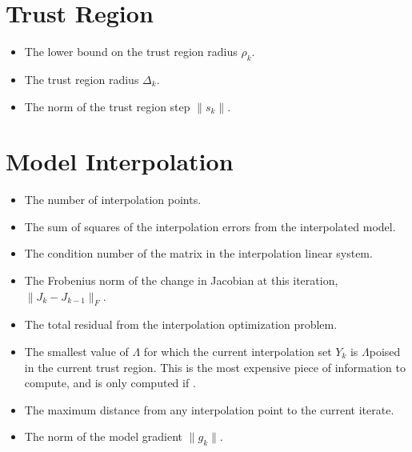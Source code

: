 \documentclass[letterpaper,10pt,english]{sphinxmanual}
\begin{document}
\section{Trust Region}
\label{\detokenize{diagnostic:trust-region}}\begin{itemize}
\item {} 
 \sphinxhyphen{} The lower bound on the trust region radius \(\rho_k\).

\item {} 
 \sphinxhyphen{} The trust region radius \(\Delta_k\).

\item {} 
 \sphinxhyphen{} The norm of the trust region step \(\|s_k\|\).

\end{itemize}


\section{Model Interpolation}
\label{\detokenize{diagnostic:model-interpolation}}\begin{itemize}
\item {} 
 \sphinxhyphen{} The number of interpolation points.

\item {} 
 \sphinxhyphen{} The sum of squares of the interpolation errors from the interpolated model.

\item {} 
 \sphinxhyphen{} The condition number of the matrix in the interpolation linear system.

\item {} 
 \sphinxhyphen{} The Frobenius norm of the change in Jacobian at this iteration, \(\|J_k-J_{k-1}\|_F\).

\item {} 
 \sphinxhyphen{} The total residual from the interpolation optimization problem.

\item {} 
 \sphinxhyphen{} The smallest value of \(\Lambda\) for which the current interpolation set \(Y_k\) is \(\Lambda\)\sphinxhyphen{}poised in the current trust region. This is the most expensive piece of information to compute, and is only computed if \sphinxcode{\sphinxupquote{user\_params{[}\textquotesingle{}logging.save\_poisedness\textquotesingle{} = True}}.

\item {} 
 \sphinxhyphen{} The maximum distance from any interpolation point to the current iterate.

\item {} 
 \sphinxhyphen{} The norm of the model gradient \(\|g_k\|\).

\end{itemize}
\end{document}

